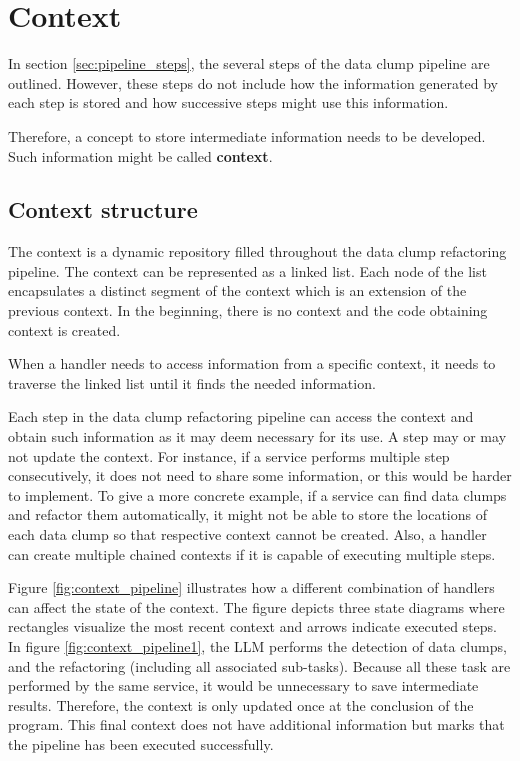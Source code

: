 \section{Context}\label{sec:context}
In section \ref{sec:pipeline_steps}, the several steps of the data clump pipeline are outlined. However, these steps do not include how the information generated by each step is stored and how successive steps might use this information.

Therefore, a concept to store intermediate information needs to be developed. Such information might be called \textbf{context}.
\subsection{Context structure}
The context is a  dynamic repository filled throughout the data clump refactoring pipeline. The context can be represented as a linked list. Each node of the list encapsulates a distinct segment of the context which is an extension of the previous context. In the beginning, there is no context and the code obtaining context is created.

When a handler needs to access information from a specific context, it needs to traverse the linked list until it finds the needed information. 


Each step in the data clump refactoring pipeline can access the context and obtain such information as it may deem necessary for its use. A step may or may not update the context. For instance, if a service performs multiple step consecutively, it does not need to share  some information, or this would be harder to implement. To give a more concrete example, if a service can find data clumps and refactor them automatically, it might not be able to store the locations of each data clump so that respective context cannot be created. Also, a handler can create multiple chained contexts if it is capable of executing multiple steps. 




Figure \ref{fig:context_pipeline} illustrates how a different combination of handlers can affect the state of the context. The figure depicts three state diagrams where rectangles visualize the most recent context and arrows indicate executed steps.  In figure \ref{fig:context_pipeline1}, the \ac{LLM} performs the detection of data clumps, and the refactoring (including all associated sub-tasks). Because all these task are performed by the same service, it would be unnecessary to save intermediate results. Therefore, the context is only updated once at the conclusion of the program. This final context does not have additional information but marks that the pipeline has been executed successfully.
 

